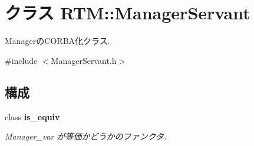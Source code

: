 \section{クラス RTM::ManagerServant}
\label{classRTM_1_1ManagerServant}


ManagerのCORBA化クラス.  




{\ttfamily \#include $<$ManagerServant.h$>$}

\subsection*{構成}
\begin{DoxyCompactItemize}
\item 
class {\bfseries is\_\-equiv}
\begin{DoxyCompactList}\small\item\em Manager\_\-var が等価かどうかのファンクタ. \item\end{DoxyCompactList}\end{DoxyCompactItemize}
